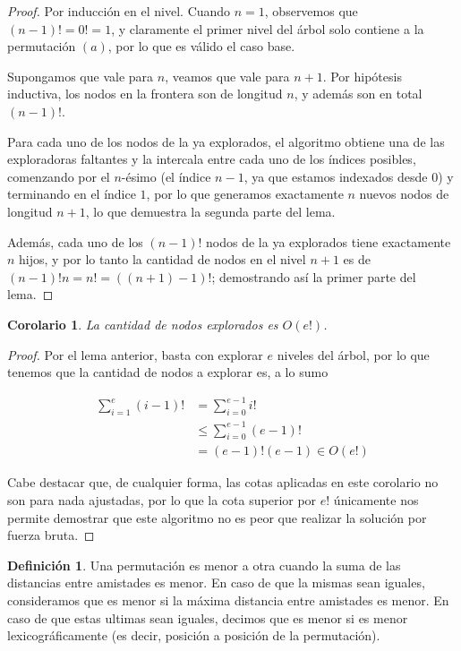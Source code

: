 \documentclass{article}
\newtheorem{corollary}{Corolario}[theorem]
\theoremstyle{definition}
\newtheorem{definition}{Definición}[section]
\theoremstyle{remark}
\begin{document}
\begin{proof}
Por inducción en el nivel. Cuando $n = 1$, observemos que $(n-1)! = 0! = 1$, y claramente el primer nivel del árbol solo contiene a la permutación $(a)$, por lo que es válido el caso base.

Supongamos que vale para $n$, veamos que vale para $n+1$. Por hipótesis inductiva, los nodos en la frontera son de longitud $n$, y además son en total $(n-1)!$.

Para cada uno de los nodos de la ya explorados, el algoritmo obtiene una de las exploradoras faltantes y la intercala entre cada uno de los índices posibles, comenzando por el $n$-ésimo (el índice $n-1$, ya que estamos indexados desde $0$) y terminando en el índice $1$, por lo que generamos exactamente $n$ nuevos nodos de longitud $n+1$, lo que demuestra la segunda parte del lema.

Además, cada uno de los $(n-1)!$ nodos de la ya explorados tiene exactamente $n$ hijos, y por lo tanto la cantidad de nodos en el nivel $n+1$ es de $(n-1)! n = n! = ((n + 1) - 1)!$; demostrando así la primer parte del lema.
\end{proof}

\begin{corollary}
La cantidad de nodos explorados es $O(e!)$.
\label{ej3:arbol-total}
\end{corollary}

\begin{proof}
Por el lema anterior, basta con explorar $e$ niveles del árbol, por lo que tenemos que la cantidad de nodos a explorar es, a lo sumo

\begin{equation}
\begin{aligned}
\sum_{i=1}^{e} (i-1)! &= \sum_{i=0}^{e-1} i! \\
&\leq \sum_{i=0}^{e-1} (e-1)! \\
&= (e-1)! (e-1) \in O(e!)
\end{aligned}
\end{equation}

Cabe destacar que, de cualquier forma, las cotas aplicadas en este corolario no son para nada ajustadas, por lo que la cota superior por $e!$ únicamente nos permite demostrar que este algoritmo no es peor que realizar la solución por fuerza bruta.
\end{proof}

\begin{definition}
Una permutación es menor a otra cuando la suma de las distancias entre amistades es menor. En caso de que la mismas sean iguales, consideramos que es menor si la máxima distancia entre amistades es menor. En caso de que estas ultimas sean iguales, decimos que es menor si es menor lexicográficamente (es decir, posición a posición de la permutación). 
\end{definition}
\end{document}
